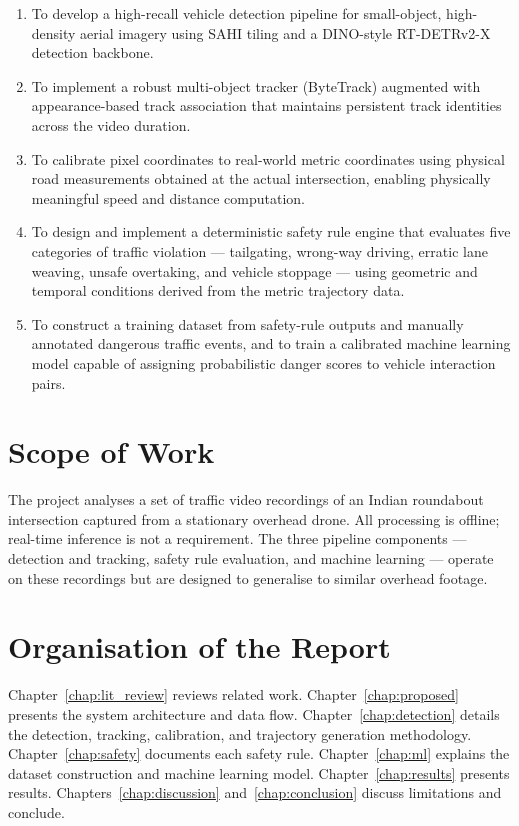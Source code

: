 \begin{enumerate}
    \item To develop a high-recall vehicle detection pipeline for small-object, high-density
          aerial imagery using SAHI tiling and a DINO-style RT-DETRv2-X detection backbone.
    \item To implement a robust multi-object tracker (ByteTrack) augmented with appearance-based
          track association that maintains persistent track identities across the video duration.
    \item To calibrate pixel coordinates to real-world metric coordinates using physical
          road measurements obtained at the actual intersection, enabling physically
          meaningful speed and distance computation.
    \item To design and implement a deterministic safety rule engine that evaluates five
          categories of traffic violation --- tailgating, wrong-way driving, erratic lane
          weaving, unsafe overtaking, and vehicle stoppage --- using geometric and temporal
          conditions derived from the metric trajectory data.
    \item To construct a training dataset from safety-rule outputs and manually annotated
          dangerous traffic events, and to train a calibrated machine learning model capable
          of assigning probabilistic danger scores to vehicle interaction pairs.
\end{enumerate}

\section{Scope of Work}

The project analyses a set of traffic video recordings of an Indian roundabout intersection
captured from a stationary overhead drone.  All processing is offline; real-time inference
is not a requirement.  The three pipeline components --- detection and tracking, safety rule
evaluation, and machine learning --- operate on these recordings but are designed to generalise
to similar overhead footage.

\section{Organisation of the Report}

Chapter~\ref{chap:lit_review} reviews related work.
Chapter~\ref{chap:proposed} presents the system architecture and data flow.
Chapter~\ref{chap:detection} details the detection, tracking, calibration, and trajectory
generation methodology.
Chapter~\ref{chap:safety} documents each safety rule.
Chapter~\ref{chap:ml} explains the dataset construction and machine learning model.
Chapter~\ref{chap:results} presents results.
Chapters~\ref{chap:discussion} and~\ref{chap:conclusion} discuss limitations and conclude.